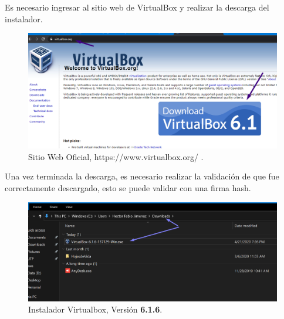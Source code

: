 \documentclass[letterpaper, 12pt, oneside]{article}
\begin{document}
    Es necesario ingresar al sitio web de VirtualBox y realizar la descarga del instalador.
    \begin{center}
    \begin{figure}[H]
        \includegraphics[scale=1]{img/install/virtualbox1.png}
        \caption{Sitio Web Oficial, https://www.virtualbox.org/ .}
        \label{fig:vbox1}
    \end{figure}
    \end{center}

    Una vez terminada la descarga, es necesario realizar la validación de que fue correctamente descargado, esto se puede validar con una firma hash. 
    \begin{center}
     \begin{figure}[H]
        \includegraphics[scale=0.7]{img/install/virtualbox2.png}
        \caption{Instalador Virtualbox, Versión \textbf{6.1.6}.}
        \label{fig:vbox2}
    \end{figure}       
    \end{center}
\end{document}

